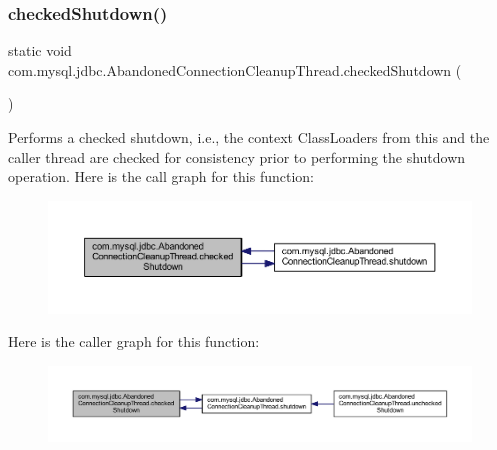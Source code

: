 \subsubsection{\texorpdfstring{checked\+Shutdown()}{checkedShutdown()}}
{\footnotesize\ttfamily static void com.\+mysql.\+jdbc.\+Abandoned\+Connection\+Cleanup\+Thread.\+checked\+Shutdown (\begin{DoxyParamCaption}{ }\end{DoxyParamCaption})\hspace{0.3cm}{\ttfamily [static]}}

Performs a checked shutdown, i.\+e., the context Class\+Loaders from this and the caller thread are checked for consistency prior to performing the shutdown operation. Here is the call graph for this function\+:\nopagebreak
\begin{figure}[H]
\begin{center}
\leavevmode
\includegraphics[width=350pt]{classcom_1_1mysql_1_1jdbc_1_1_abandoned_connection_cleanup_thread_a1f3b87e39a583628bdae7b298b3882c3_cgraph}
\end{center}
\end{figure}
Here is the caller graph for this function\+:\nopagebreak
\begin{figure}[H]
\begin{center}
\leavevmode
\includegraphics[width=350pt]{classcom_1_1mysql_1_1jdbc_1_1_abandoned_connection_cleanup_thread_a1f3b87e39a583628bdae7b298b3882c3_icgraph}
\end{center}
\end{figure}
\mbox{\label{classcom_1_1mysql_1_1jdbc_1_1_abandoned_connection_cleanup_thread_aadfff88a87e766a3c6ad7cc6ced32b89}} 
